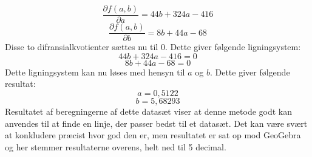 \begin{equation*}
    \frac{\partial f(a,b)}{\partial a} = 44b + 324a - 416
\end{equation*}
\begin{equation*}
    \frac{\partial f(a,b)}{\partial b} = 8b + 44a - 68
\end{equation*}
Disse to difransialkvotienter sættes nu til 0. Dette giver følgende ligningsystem:
\begin{equation*}
    44b + 324a - 416 = 0
\end{equation*}
\begin{equation*}
    8b + 44a - 68 = 0
\end{equation*}
Dette ligningsystem kan nu løses med hensyn til $a$ og $b$. Dette giver følgende resultat: %
\begin{equation*}
    a = 0,5122 
\end{equation*}
\begin{equation*}
    b = 5,68293
\end{equation*}
Resultatet af beregningerne af dette datasæt viser at denne metode godt kan anvendes til at finde en linje, der passer bedst til et datasæt. Det kan være svært at konkludere præcist hvor god den er, men resultatet er sat op mod GeoGebra og her stemmer resultaterne overens, helt ned til 5 decimal.


